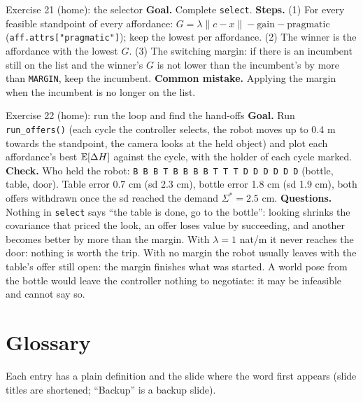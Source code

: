 \documentclass[11pt]{article}
\begin{document}
\begin{labhelp}{Exercise 21 (home): the selector}
\textbf{Goal.} Complete \texttt{select}. \textbf{Steps.} (1) For every feasible standpoint of every affordance: $G=\lambda\lVert c-x\rVert-\text{gain}-\text{pragmatic}$ (\texttt{aff.attrs["pragmatic"]}); keep the lowest per affordance. (2) The winner is the affordance with the lowest $G$. (3) The switching margin: if there is an incumbent still on the list and the winner's $G$ is not lower than the incumbent's by more than \texttt{MARGIN}, keep the incumbent.  \textbf{Common mistake.} Applying the margin when the incumbent is no longer on the list.
\end{labhelp}

\begin{labhelp}{Exercise 22 (home): run the loop and find the hand-offs}
\textbf{Goal.} Run \texttt{run\_offers()} (each cycle the controller selects, the robot moves up to 0.4 m towards the standpoint, the camera looks at the held object) and plot each affordance's best $\mathbb{E}[\Delta H]$ against the cycle, with the holder of each cycle marked. \textbf{Check.} Who held the robot: \texttt{B B B T B B B B T T T D D D D D D} (bottle, table, door). Table error 0.7 cm (sd 2.3 cm), bottle error 1.8 cm (sd 1.9 cm), both offers withdrawn once the sd reached the demand $\Sigma^\ast=2.5$ cm. \textbf{Questions.} Nothing in \texttt{select} says ``the table is done, go to the bottle'': looking shrinks the covariance that priced the look, an offer loses value by succeeding, and another becomes better by more than the margin. With $\lambda=1$ nat/m it never reaches the door: nothing is worth the trip. With no margin the robot usually leaves with the table's offer still open: the margin finishes what was started. A world pose from the bottle would leave the controller nothing to negotiate: it may be infeasible and cannot say so.
\end{labhelp}

\section{Glossary}

Each entry has a plain definition and the slide where the word first appears (slide titles are shortened; ``Backup'' is a backup slide).
\end{document}
